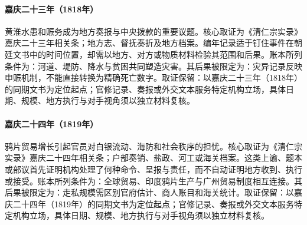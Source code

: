 \hypertarget{ledger:EQ-1818-FLOOD-RELIEF}{}\paragraph{嘉庆二十三年（1818年）}黄淮水患和赈务成为地方奏报与中央拨款的重要议题。核心取证为《清仁宗实录》嘉庆二十三年相关条；地方志、督抚奏折及地方档案。编年记录适于钉住事件在朝廷文书中的时间位置，却需以地方、对方或物质材料检验其范围和后果。账本所列条件为：河道、堤防、降水与贫困共同塑造灾害。其后果被限定为：灾异记录反映申赈机制，不能直接转换为精确死亡数字。取证保留：以嘉庆二十三年（1818年）的同期文书为定位起点；官修记录、奏报或外交文本服务特定机构立场，具体日期、规模、地方执行与对手视角须以独立材料复核。
\hypertarget{ledger:EQ-1819-OPIUM-TRADE-GROWTH}{}\paragraph{嘉庆二十四年（1819年）}鸦片贸易增长引起官员对白银流动、海防和社会秩序的担忧。核心取证为《清仁宗实录》嘉庆二十四年相关条；户部奏销、盐政、河工或海关档案。这类上谕、题本或部议首先证明机构处理了何种命令、呈报与责任，而不自动证明地方收到、执行或接受。账本所列条件为：全球贸易、印度鸦片生产与广州贸易制度相互连接。其后果被限定为：走私规模需区别官府估计、商人账目和海关统计。取证保留：以嘉庆二十四年（1819年）的同期文书为定位起点；官修记录、奏报或外交文本服务特定机构立场，具体日期、规模、地方执行与对手视角须以独立材料复核。
